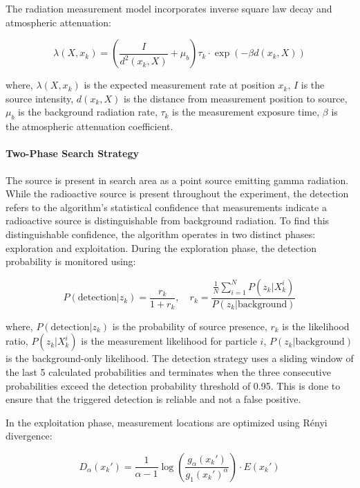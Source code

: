\documentclass[../report.tex]{subfiles}
\begin{document}
    The radiation measurement model incorporates inverse square law decay and atmospheric attenuation:

    \begin{equation}
    \lambda(X, x_k) = \left(\frac{I}{d^2(x_k, X)} + \mu_b\right)\tau_k \cdot \exp(-\beta d(x_k, X))
    \label{eq:entropy_measurement_model}
    \end{equation}

    where, $\lambda(X, x_k)$ is the expected measurement rate at position $x_k$, $I$ is the source intensity, $d(x_k, X)$ is the distance from measurement position to source, $\mu_b$ is the 
    background radiation rate, $\tau_k$ is the measurement exposure time, $\beta$ is the atmospheric attenuation coefficient.

    \paragraph{Two-Phase Search Strategy}
    The source is present in search area as a point source emitting gamma radiation. While the radioactive source is present throughout the experiment, the 
    detection refers to the algorithm's statistical confidence that measurements indicate a radioactive source is distinguishable from background radiation. To
    find this distinguishable confidence, the algorithm operates in two distinct phases: exploration and exploitation. 
    During the exploration phase, the detection probability is monitored using:

    \begin{equation}
    P(\text{detection}|z_k) = \frac{r_k}{1 + r_k}, \quad r_k = \frac{\frac{1}{N}\sum_{i=1}^N P(z_k|X_k^i)}{P(z_k|\text{background})}
    \label{eq:prob_detection}
    \end{equation}

    where, $P(\text{detection}|z_k)$ is the probability of source presence, $r_k$ is the likelihood ratio, $P(z_k|X_k^i)$ is the measurement likelihood for particle $i$, $P(z_k|\text{background})$ 
    is the background-only likelihood. The detection strategy uses a sliding window of the last 5 calculated probabilities and terminates when the three consecutive probabilities exceed the detection
    probability threshold of 0.95. This is done to ensure that the triggered detection is reliable and not a false positive.

    In the exploitation phase, measurement locations are optimized using Rényi divergence:

    \begin{equation}
    D_\alpha(x_k') = \frac{1}{\alpha-1} \log\left(\frac{g_\alpha(x_k')}{g_1(x_k')^\alpha}\right) \cdot E(x_k')
    \end{equation}
\end{document}
